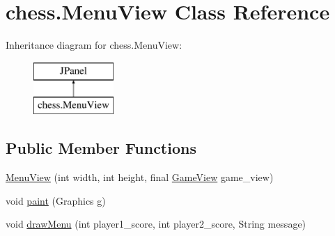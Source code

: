 \hypertarget{classchess_1_1_menu_view}{}\section{chess.\+Menu\+View Class Reference}
\label{classchess_1_1_menu_view}
Inheritance diagram for chess.\+Menu\+View\+:\begin{figure}[H]
\begin{center}
\leavevmode
\includegraphics[height=2.000000cm]{classchess_1_1_menu_view}
\end{center}
\end{figure}
\subsection*{Public Member Functions}
\begin{DoxyCompactItemize}
\item 
\hyperlink{classchess_1_1_menu_view_a32fab9a8ed947bdf0552c22c781fe223}{Menu\+View} (int width, int height, final \hyperlink{classchess_1_1_game_view}{Game\+View} game\+\_\+view)
\item 
void \hyperlink{classchess_1_1_menu_view_ab6387368d456b68343d2703db50dfcad}{paint} (Graphics g)
\item 
void \hyperlink{classchess_1_1_menu_view_afa544160eff3554f30c96c24ef5c7e0f}{draw\+Menu} (int player1\+\_\+score, int player2\+\_\+score, String message)
\end{DoxyCompactItemize}
